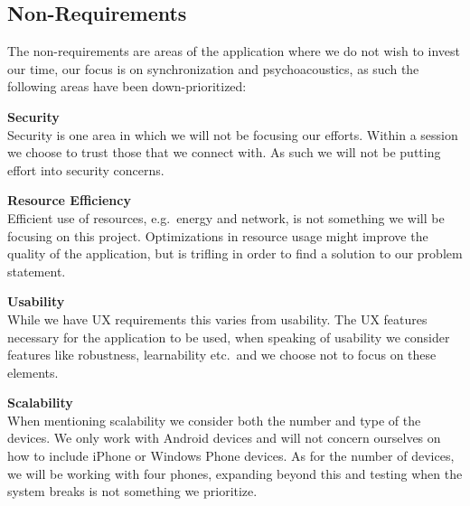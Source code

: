 \subsection*{Non-Requirements}\label{par:non_requirements}
The non-requirements are areas of the application where we do not wish to invest our time, our focus is on synchronization and psychoacoustics, as such the following areas have been down-prioritized:
\begin{eromanrate}
    \item \textbf{Security} \hfill\\
    Security is one area in which we will not be focusing our efforts.
    Within a session we choose to trust those that we connect with.
    As such we will not be putting effort into security concerns.
    \item \textbf{Resource Efficiency} \hfill\\
    Efficient use of resources, e.g.~energy and network, is not something we will be focusing on this project.
    Optimizations in resource usage might improve the quality of the application, but is trifling in order to find a solution to our problem statement.
    \item \textbf{Usability} \hfill\\
    While we have \ac{UX} requirements this varies from usability.
    The \ac{UX} features necessary for the application to be used, when speaking of usability we consider features like robustness, learnability etc.~and we choose not to focus on these elements.
    \item \textbf{Scalability} \hfill\\
    When mentioning scalability we consider both the number and type of the devices.
    We only work with Android devices and will not concern ourselves on how to include iPhone or Windows Phone devices.
    As for the number of devices, we will be working with four phones, expanding beyond this and testing when the system breaks is not something we prioritize.
\end{eromanrate}
